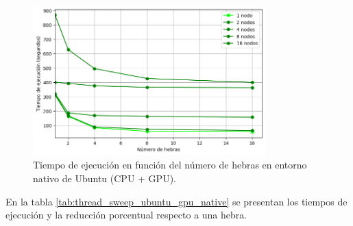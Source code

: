 \begin{figure}[ht]
    \centering
    \includegraphics[width=0.8\textwidth]{imagenes/cap5/thread_sweep_ubuntu_gpu_native_time.png}
    \caption{Tiempo de ejecución en función del número de hebras en entorno nativo de Ubuntu (CPU + GPU).}
    \label{fig:thread_sweep_ubuntu_gpu_native_time}
\end{figure}

En la tabla \ref{tab:thread_sweep_ubuntu_gpu_native} se presentan los tiempos de ejecución y la reducción porcentual respecto a una hebra.

